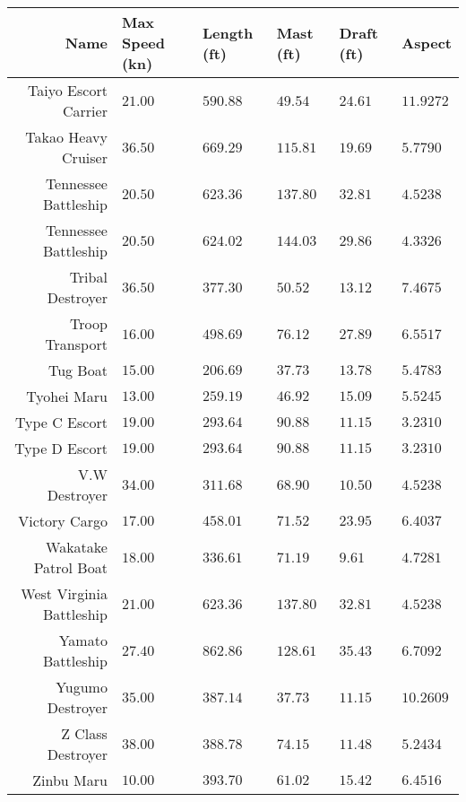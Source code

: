 \documentclass{article}
\begin{document}
\pagebreak
\begin{tabularx}{\textwidth}{|r|l|l|X|X|X|}
\hline
Name & Max Speed (kn) & Length (ft) & Mast (ft) & Draft (ft) & Aspect\\
\hline
Taiyo Escort Carrier & $21.00$ & $590.88$ & $49.54$ & $24.61$ & $11.9272$ \\
\hline
Takao Heavy Cruiser & $36.50$ & $669.29$ & $115.81$ & $19.69$ & $5.7790$ \\
\hline
Tennessee Battleship & $20.50$ & $623.36$ & $137.80$ & $32.81$ & $4.5238$ \\
\hline
Tennessee Battleship & $20.50$ & $624.02$ & $144.03$ & $29.86$ & $4.3326$ \\
\hline
Tribal Destroyer & $36.50$ & $377.30$ & $50.52$ & $13.12$ & $7.4675$ \\
\hline
Troop Transport & $16.00$ & $498.69$ & $76.12$ & $27.89$ & $6.5517$ \\
\hline
Tug Boat & $15.00$ & $206.69$ & $37.73$ & $13.78$ & $5.4783$ \\
\hline
Tyohei Maru & $13.00$ & $259.19$ & $46.92$ & $15.09$ & $5.5245$ \\
\hline
Type C Escort & $19.00$ & $293.64$ & $90.88$ & $11.15$ & $3.2310$ \\
\hline
Type D Escort & $19.00$ & $293.64$ & $90.88$ & $11.15$ & $3.2310$ \\
\hline
V.W Destroyer & $34.00$ & $311.68$ & $68.90$ & $10.50$ & $4.5238$ \\
\hline
Victory Cargo & $17.00$ & $458.01$ & $71.52$ & $23.95$ & $6.4037$ \\
\hline
Wakatake Patrol Boat & $18.00$ & $336.61$ & $71.19$ & $9.61$ & $4.7281$ \\
\hline
West Virginia Battleship & $21.00$ & $623.36$ & $137.80$ & $32.81$ & $4.5238$ \\
\hline
Yamato Battleship & $27.40$ & $862.86$ & $128.61$ & $35.43$ & $6.7092$ \\
\hline
Yugumo Destroyer & $35.00$ & $387.14$ & $37.73$ & $11.15$ & $10.2609$ \\
\hline
Z Class Destroyer & $38.00$ & $388.78$ & $74.15$ & $11.48$ & $5.2434$ \\
\hline
Zinbu Maru & $10.00$ & $393.70$ & $61.02$ & $15.42$ & $6.4516$ \\
\hline
\end{tabularx}
\pagebreak
\end{document}
